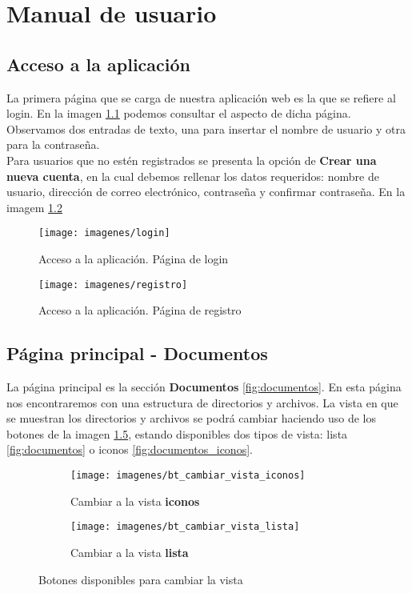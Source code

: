 \chapter{Manual de usuario}

\section{Acceso a la aplicación}
La primera página que se carga de nuestra aplicación web es la que se refiere al login. En la imagen \ref{fig:login} podemos consultar el aspecto de dicha página. Observamos dos entradas de texto, una para insertar el nombre de usuario y otra para la contraseña. \\

Para usuarios que no estén registrados se presenta la opción de \textbf{Crear una nueva cuenta}, en la cual debemos rellenar los datos requeridos: nombre de usuario, dirección de correo electrónico, contraseña y confirmar contraseña. En la imagem \ref{fig:registro}

\begin{figure}[H]
	\centering
	\texttt{[image: imagenes/login]}
	\caption{Acceso a la aplicación. Página de login}
	\label{fig:login}
\end{figure}

\begin{figure}[H]
	\centering
	\texttt{[image: imagenes/registro]}
	\caption{Acceso a la aplicación. Página de registro}
	\label{fig:registro}
\end{figure}

\section{Página principal - Documentos}
La página principal es la sección \textbf{Documentos} \ref{fig:documentos}. En esta página nos encontraremos con una estructura de directorios y archivos. La vista en que se muestran los directorios y archivos se podrá cambiar haciendo uso de los botones de la imagen \ref{fig:bts_cambiar_vista}, estando disponibles dos tipos de vista: lista \ref{fig:documentos} o iconos \ref{fig:documentos_iconos}.


\begin{figure}[H]
	\centering
	\begin{subfigure}{0.4\textwidth}
		\centering
		\texttt{[image: imagenes/bt\_cambiar\_vista\_iconos]}
		\caption{Cambiar a la vista \textbf{iconos}}
		\label{fig:bt_cambiar_vista_iconos}
	\end{subfigure}%
	\begin{subfigure}{0.4\textwidth}
		\centering
		\texttt{[image: imagenes/bt\_cambiar\_vista\_lista]}
		\caption{Cambiar a la vista \textbf{lista}}
		\label{fig:bt_cambiar_vista_lista}
	\end{subfigure}
	\caption{Botones disponibles para cambiar la vista}
	\label{fig:bts_cambiar_vista}
\end{figure}

